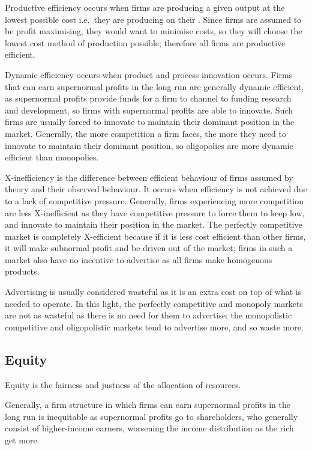 \documentclass[Economics.tex]{subfiles}
\begin{document}
Productive efficiency occurs when firms are producing a given output at the lowest possible cost i.e.\ they are producing on their . Since firms are assumed to be profit maximising, they would want to minimise costs, so they will choose the lowest cost method of production possible; therefore all firms are productive efficient.

Dynamic efficiency occurs when product and process innovation occurs. Firms that can earn supernormal profits in the long run are generally dynamic efficient, as supernormal profits provide funds for a firm to channel to funding research and development, so firms with supernormal profits are able to innovate. Such firms are usually forced to innovate to maintain their dominant position in the market. Generally, the more competition a firm faces, the more they need to innovate to maintain their dominant position, so oligopolies are more dynamic efficient than monopolies.

X-inefficiency is the difference between efficient behaviour of firms assumed by theory and their observed behaviour. It occurs when efficiency is not achieved due to a lack of competitive pressure. Generally, firms experiencing more competition are less X-inefficient as they have competitive pressure to force them to keep  low, and innovate to maintain their position in the market. The perfectly competitive market is completely X-efficient because if it is less cost efficient than other firms, it will make subnormal profit and be driven out of the market; firms in such a market also have no incentive to advertise as all firms make homogenous products.

Advertising is usually considered wasteful as it is an extra cost on top of what is needed to operate. In this light, the perfectly competitive and monopoly markets are not as wasteful as there is no need for them to advertise; the monopolistic competitive and oligopolistic markets tend to advertise more, and so waste more.
\subsection{Equity}
Equity is the fairness and justness of the allocation of resources.

Generally, a firm structure in which firms can earn supernormal profits in the long run is inequitable as supernormal profits go to shareholders, who generally consist of higher-income earners, worsening the income distribution as the rich get more.
\end{document}
